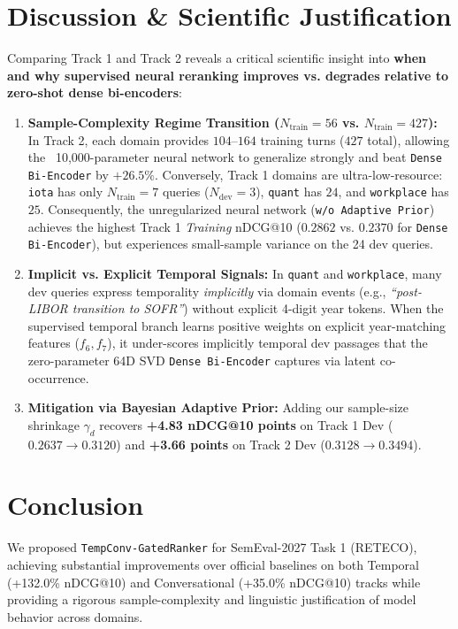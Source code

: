 \documentclass[10pt,twocolumn]{article}
\begin{document}
\section{Discussion \& Scientific Justification}
Comparing Track 1 and Track 2 reveals a critical scientific insight into \textbf{when and why supervised neural reranking improves vs. degrades relative to zero-shot dense bi-encoders}:
\begin{enumerate}
    \item \textbf{Sample-Complexity Regime Transition ($N_{\text{train}}=56$ vs. $N_{\text{train}}=427$):} In Track 2, each domain provides $104\text{--}164$ training turns ($427$ total), allowing the ~10,000-parameter neural network to generalize strongly and beat \texttt{Dense Bi-Encoder} by $+26.5\%$. Conversely, Track 1 domains are ultra-low-resource: \texttt{iota} has only $N_{\text{train}}=7$ queries ($N_{\text{dev}}=3$), \texttt{quant} has $24$, and \texttt{workplace} has $25$. Consequently, the unregularized neural network (\texttt{w/o Adaptive Prior}) achieves the highest Track 1 \emph{Training} nDCG@10 ($0.2862$ vs. $0.2370$ for \texttt{Dense Bi-Encoder}), but experiences small-sample variance on the 24 dev queries.
    \item \textbf{Implicit vs. Explicit Temporal Signals:} In \texttt{quant} and \texttt{workplace}, many dev queries express temporality \emph{implicitly} via domain events (e.g., \emph{``post-LIBOR transition to SOFR''}) without explicit 4-digit year tokens. When the supervised temporal branch learns positive weights on explicit year-matching features ($f_6, f_7$), it under-scores implicitly temporal dev passages that the zero-parameter 64D SVD \texttt{Dense Bi-Encoder} captures via latent co-occurrence.
    \item \textbf{Mitigation via Bayesian Adaptive Prior:} Adding our sample-size shrinkage $\gamma_d$ recovers \textbf{+4.83 nDCG@10 points} on Track 1 Dev ($0.2637 \rightarrow 0.3120$) and \textbf{+3.66 points} on Track 2 Dev ($0.3128 \rightarrow 0.3494$).
\end{enumerate}

\section{Conclusion}
We proposed \texttt{TempConv-GatedRanker} for SemEval-2027 Task 1 (RETECO), achieving substantial improvements over official baselines on both Temporal (+132.0\% nDCG@10) and Conversational (+35.0\% nDCG@10) tracks while providing a rigorous sample-complexity and linguistic justification of model behavior across domains.
\end{document}
